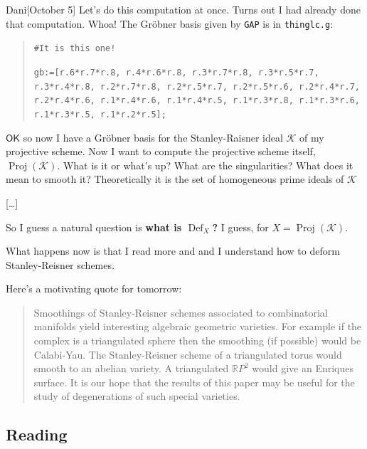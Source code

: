 \begin{thing3}{Dani}[October 5]\leavevmode
	Let's do this computation at once. Turns out I had already done that computation. Whoa! The Gröbner basis given by \texttt{GAP} is in \texttt{thinglc.g}:

{\color{4}\begin{quotation}
		\texttt {\#It is this one!}

	\texttt{gb:=[r.6*r.7*r.8, r.4*r.6*r.8, r.3*r.7*r.8, r.3*r.5*r.7, r.3*r.4*r.8, r.2*r.7*r.8, r.2*r.5*r.7, r.2*r.5*r.6, 
r.2*r.4*r.7, r.2*r.4*r.6, r.1*r.4*r.6, r.1*r.4*r.5, r.1*r.3*r.8, r.1*r.3*r.6, r.1*r.3*r.5, r.1*r.2*r.5];}
\end{quotation}}

$\mathsf{OK}$ so now I have a Gröbner basis for the Stanley-Raisner ideal $\mathcal{K}$ of my projective scheme. Now I want to compute the projective scheme itself, $\operatorname{Proj}(\mathcal{K})$. What is it or what's up? What are the singularities? What does it mean to smooth it? Theoretically it is the set of homogeneous prime ideals of $\mathcal{K}$

[…]

So I guess a natural question is \textbf{what is $\operatorname{Def}_{X}$?} I guess, for $X=\operatorname{Proj}(\mathcal{K})$.
\begin{thing3}{What happens now}\leavevmode
	is that I read more \cite{jan1} and \cite{jan2} and I understand how to deform Stanley-Reisner schemes.

	Here's a motivating quote for tomorrow:

{\color{7}\begin{quotation}
	Smoothings of Stanley-Reisner schemes associated to combinatorial manifolds yield interesting algebraic geometric varieties. For example if the complex is a triangulated sphere then the smoothing (if possible) would be Calabi-Yau. The Stanley-Reisner scheme of a triangulated torus would smooth to an abelian variety. A triangulated $\mathbb{R}P^{2}$ would give an Enriques surface. It is our hope that the results of this paper may be useful for the study of degenerations of such special varieties. 
\end{quotation}}
\end{thing3}

\end{thing3}

\subsection{Reading \cite{jan2}}

